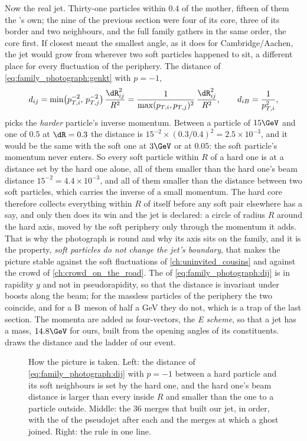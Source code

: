 Now the real jet. Thirty-one particles within $0.4$ of the mother, fifteen
of them the \Bbar's own; the nine of the previous section were four of
its core, three of its border and two neighbours, and the full family
gathers in the same order, the core first. If closest meant the smallest
angle, as it does for Cambridge/Aachen, the jet would grow from wherever
two soft particles happened to sit, a different place for every
fluctuation of the periphery. The distance of
\cref{eq:family_photograph:genkt} with $p=-1$,
\begin{equation}
  \dij=\min\!\big(p_{T,i}^{-2},\,p_{T,j}^{-2}\big)\,\frac{\dR_{ij}^2}{R^2}
      =\frac{1}{\max(p_{T,i},p_{T,j})^2}\,\frac{\dR_{ij}^2}{R^2},\qquad
  \diB=\frac{1}{p_{T,i}^2},
  \label{eq:family_photograph:dij}
\end{equation}
picks the \emph{harder} particle's inverse momentum. Between a particle of $15\GeV$ and one of $0.5$ at $\dR=0.3$ the
distance is $15^{-2}\times(0.3/0.4)^2=2.5\times10^{-3}$, and it would be
the same with the soft one at $3\GeV$ or at $0.05$: the soft particle's
momentum never enters. So every soft particle within $R$ of a hard one is
at a distance set by the hard one alone, all of them smaller than the
hard one's beam distance $15^{-2}=4.4\times10^{-3}$, and all of them
smaller than the distance between two soft particles, which carries the
inverse of a small momentum. The hard core therefore collects everything
within $R$ of itself before any soft pair elsewhere has a say, and only
then does its \diB win and the jet is declared: a circle of radius $R$
around the hard axis, moved by the soft periphery only through the
momentum it adds. That is why the photograph is round and why its axis
sits on the family, and it is the property, \emph{soft particles do not
change the jet's boundary}, that makes the picture stable against the
soft fluctuations of \cref{ch:uninvited_cousins} and against the crowd of
\cref{ch:crowd_on_the_road}. The \dR of
\cref{eq:family_photograph:dij} is in rapidity $y$ and not in
pseudorapidity, so that the distance is invariant under boosts along the
beam; for the massless particles of the periphery the two coincide, and
for a B~meson of half a GeV they do not, which is a trap of the last
section. The momenta are added as four-vectors, the \emph{E scheme}, so
that a jet has a mass, $14.8\GeV$ for ours, built from the opening angles
of its constituents.
 draws the distance and the
ladder of our event.

\begin{figure}[htbp]\centering
\resizebox{\textwidth}{!}{}
\caption[The anti-$k_T$ distance, the ladder of our jet and the rule]{How
the picture is taken. Left: the distance of
\cref{eq:family_photograph:dij} with $p=-1$ between a hard particle and
its soft neighbours is set by the hard one, and the hard one's beam
distance is larger than every \dij inside $R$ and smaller than the one
to a particle outside. Middle: the 36 merges that built our \akfour jet,
in order, with the \pt of the pseudojet after each and the merges at
which a ghost joined. Right: the rule in one line.}
\label{fig:family_photograph:distance_sketch}
\end{figure}

